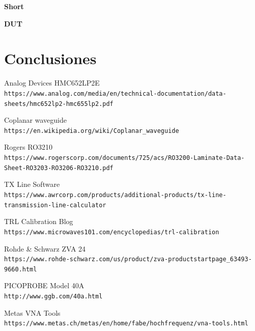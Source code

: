 \documentclass[10pt, a4paper, twocolumn]{article}
\begin{document}
\textbf{Short} \newline

\textbf{DUT} \newline

\section{Conclusiones}


\medskip

\begin{thebibliography}{9}

Analog Devices HMC652LP2E
\\\texttt{https://www.analog.com/media/en/technical-documentation/data-sheets/hmc652lp2-hmc655lp2.pdf}

Coplanar waveguide
\\\texttt{https://en.wikipedia.org/wiki/Coplanar\_waveguide}

Rogers RO3210
\\\texttt{https://www.rogerscorp.com/documents/725/acs/RO3200-Laminate-Data-Sheet-RO3203-RO3206-RO3210.pdf}

TX Line Software
\\\texttt{https://www.awrcorp.com/products/additional-products/tx-line-transmission-line-calculator}

TRL Calibration Blog
\\\texttt{https://www.microwaves101.com/encyclopedias/trl-calibration}

Rohde \& Schwarz ZVA 24
\\\texttt{https://www.rohde-schwarz.com/us/product/zva-productstartpage\_63493-9660.html}

PICOPROBE Model 40A
\\\texttt{http://www.ggb.com/40a.html}

Metas VNA Tools
\\\texttt{https://www.metas.ch/metas/en/home/fabe/hochfrequenz/vna-tools.html}

\end{thebibliography}
\end{document}
